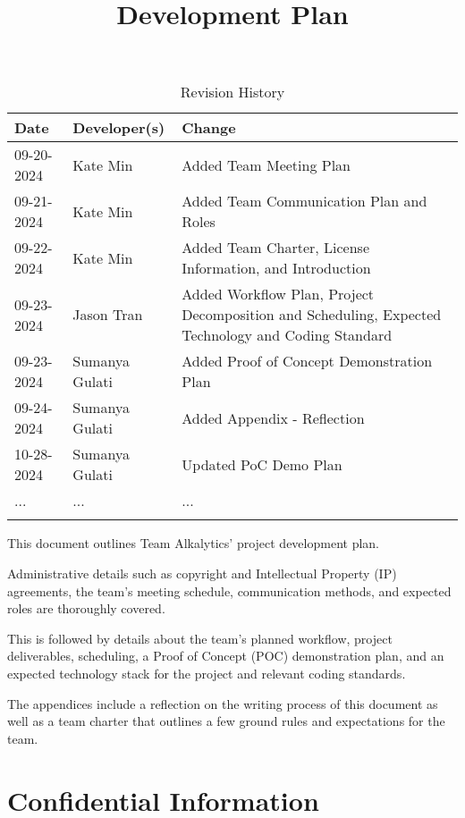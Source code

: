 \documentclass{article}
\title{Development Plan\\\progname}
\author{\authname}
\date{}
\begin{document}
\maketitle

\begin{table}[hp]
\caption{Revision History} \label{TblRevisionHistory}
\begin{tabularx}{\textwidth}{llX}
\toprule
\textbf{Date} & \textbf{Developer(s)} & \textbf{Change}\\
\midrule
09-20-2024 & Kate Min & Added Team Meeting Plan\\
09-21-2024 & Kate Min & Added Team Communication Plan and Roles\\
09-22-2024 & Kate Min & Added Team Charter, License Information, and
Introduction\\
09-23-2024 & Jason Tran & Added Workflow Plan, Project Decomposition and Scheduling, Expected Technology and
Coding Standard\\
09-23-2024 & Sumanya Gulati & Added Proof of Concept Demonstration Plan\\
09-24-2024 & Sumanya Gulati & Added Appendix - Reflection\\
10-28-2024 & Sumanya Gulati & Updated PoC Demo Plan\\
... & ... & ...\\
\bottomrule
\label{table:1}
\end{tabularx}
\end{table}

\newpage{}

\noindent This document outlines Team Alkalytics' project development
plan.\newline

\noindent Administrative details such as copyright and Intellectual Property
(IP) agreements, the team's meeting schedule, communication methods, and
expected roles are thoroughly covered.\newline

\noindent This is followed by details about the team's planned workflow, project
deliverables, scheduling, a Proof of Concept (POC) demonstration plan, and an
expected technology stack for the project and relevant coding standards.\newline

\noindent The appendices include a reflection on the writing process of this
document as well as a team charter that outlines a few ground rules and
expectations for the team.

\section{Confidential Information}
\end{document}
